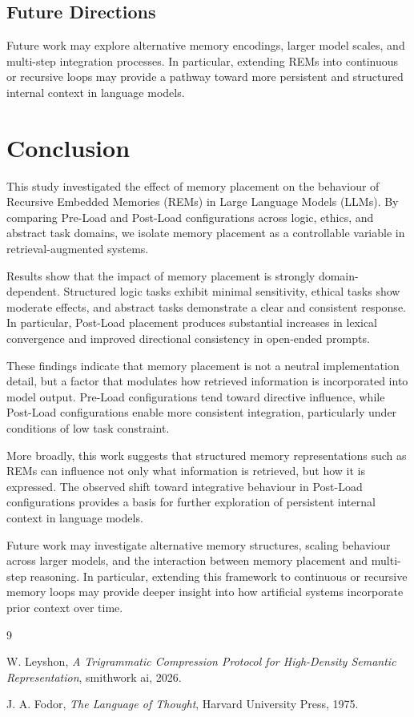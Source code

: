 \documentclass[11pt]{article}
\begin{document}
\subsection{Future Directions}

Future work may explore alternative memory encodings, larger model scales, and multi-step integration processes. In particular, extending REMs into continuous or recursive loops may provide a pathway toward more persistent and structured internal context in language models.

\section{Conclusion}

This study investigated the effect of memory placement on the behaviour of Recursive Embedded Memories (REMs) in Large Language Models (LLMs). By comparing Pre-Load and Post-Load configurations across logic, ethics, and abstract task domains, we isolate memory placement as a controllable variable in retrieval-augmented systems.

Results show that the impact of memory placement is strongly domain-dependent. Structured logic tasks exhibit minimal sensitivity, ethical tasks show moderate effects, and abstract tasks demonstrate a clear and consistent response. In particular, Post-Load placement produces substantial increases in lexical convergence and improved directional consistency in open-ended prompts.

These findings indicate that memory placement is not a neutral implementation detail, but a factor that modulates how retrieved information is incorporated into model output. Pre-Load configurations tend toward directive influence, while Post-Load configurations enable more consistent integration, particularly under conditions of low task constraint.

More broadly, this work suggests that structured memory representations such as REMs can influence not only what information is retrieved, but how it is expressed. The observed shift toward integrative behaviour in Post-Load configurations provides a basis for further exploration of persistent internal context in language models.

Future work may investigate alternative memory structures, scaling behaviour across larger models, and the interaction between memory placement and multi-step reasoning. In particular, extending this framework to continuous or recursive memory loops may provide deeper insight into how artificial systems incorporate prior context over time.

\begin{thebibliography}{9}

W. Leyshon,
\textit{A Trigrammatic Compression Protocol for High-Density Semantic Representation},
smithwork ai, 2026.

J. A. Fodor,
\textit{The Language of Thought},
Harvard University Press, 1975.

\end{thebibliography}
\end{document}
